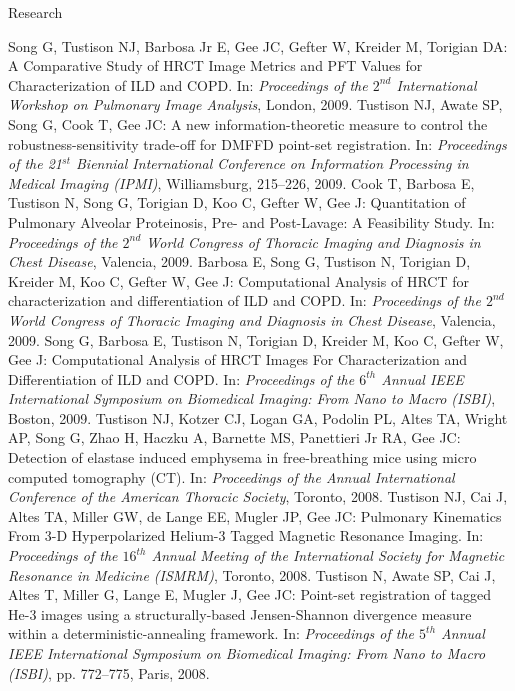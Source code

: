 \documentclass{resume}
\begin{document}
\begin{category}{Research}
\begin{itemize}
    \citemnobullet Song G, Tustison NJ, Barbosa Jr E, Gee JC, Gefter W, Kreider M, Torigian DA: A Comparative Study of HRCT Image Metrics and PFT Values for Characterization of ILD and 
COPD. In: {\em Proceedings of the $2^{nd}$ International Workshop on Pulmonary Image Analysis}, London, 2009.
    \citemnobullet Tustison NJ, Awate SP, Song G, Cook T, Gee JC: A new information-theoretic measure to control the robustness-sensitivity trade-off for DMFFD point-set registration. In: {\em Proceedings of the 21$^{st}$ Biennial International Conference on Information Processing in Medical Imaging (IPMI)}, Williamsburg, 215--226, 2009.   
     \citemnobullet Cook T, Barbosa E, Tustison N, Song G, Torigian D, Koo C, Gefter W, Gee J: Quantitation of Pulmonary Alveolar Proteinosis, Pre- and Post-Lavage: A Feasibility Study. In: {\em Proceedings of the $2^{nd}$ World Congress of Thoracic Imaging and Diagnosis in Chest Disease}, Valencia, 2009.
     \citemnobullet Barbosa E, Song G, Tustison N, Torigian D, Kreider M, Koo C, Gefter W, Gee J: Computational Analysis of HRCT for characterization and differentiation of ILD and COPD. In: {\em Proceedings of the $2^{nd}$ World Congress of Thoracic Imaging and Diagnosis in Chest Disease}, Valencia, 2009.
    \citemnobullet  Song G, Barbosa E, Tustison N, Torigian D, Kreider M, Koo C, Gefter W, Gee J: Computational Analysis of HRCT Images For Characterization and Differentiation of ILD and COPD. In:  {\em Proceedings of the $6^{th}$ Annual IEEE International Symposium on Biomedical Imaging: From Nano to Macro (ISBI)}, Boston, 2009.
     \citemnobullet Tustison NJ, Kotzer CJ, Logan GA, Podolin PL, Altes TA, Wright AP, Song G, Zhao H, Haczku A,  Barnette MS, Panettieri Jr RA, Gee JC: Detection of elastase induced emphysema in free-breathing mice using micro computed tomography (CT). In:  {\em Proceedings of the Annual International Conference of the American Thoracic Society}, Toronto, 2008.
    \citemnobullet Tustison NJ, Cai J, Altes TA, Miller GW, de Lange EE, Mugler JP, Gee JC: Pulmonary Kinematics From 3-D Hyperpolarized Helium-3 Tagged Magnetic Resonance Imaging. In:  {\em Proceedings of the $16^{th}$ Annual Meeting of the International Society for Magnetic Resonance in Medicine (ISMRM)}, Toronto, 2008.   
    \citemnobullet  Tustison N, Awate SP, Cai J, Altes T, Miller G, Lange E, Mugler J, Gee JC: Point-set registration of tagged He-3 images using a structurally-based Jensen-Shannon divergence measure within a deterministic-annealing framework. In:  {\em Proceedings of the $5^{th}$ Annual IEEE International Symposium on Biomedical Imaging: From Nano to Macro (ISBI)}, pp. 772--775, Paris, 2008.

\end{itemize}
\end{category}
\end{document}

